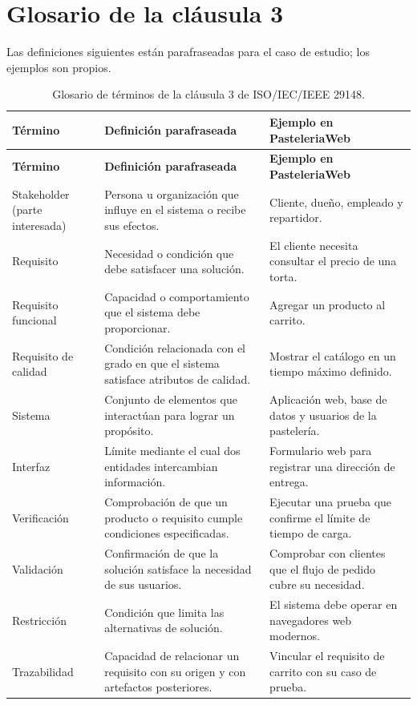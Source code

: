 \documentclass[11pt,a4paper]{article}
\begin{document}
\section{Glosario de la cláusula 3}
Las definiciones siguientes están parafraseadas para el caso de estudio; los ejemplos son propios.

\begin{longtable}{@{}L{0.24\textwidth} L{0.36\textwidth} L{0.30\textwidth}@{}}
\caption{Glosario de términos de la cláusula 3 de ISO/IEC/IEEE 29148.}\label{tab:glosario}\\
\toprule
\textbf{Término} & \textbf{Definición parafraseada} & \textbf{Ejemplo en PasteleriaWeb} \\
\midrule
\endfirsthead
\toprule
\textbf{Término} & \textbf{Definición parafraseada} & \textbf{Ejemplo en PasteleriaWeb} \\
\midrule
\endhead
Stakeholder (parte interesada) & Persona u organización que influye en el sistema o recibe sus efectos. & Cliente, dueño, empleado y repartidor. \\
Requisito & Necesidad o condición que debe satisfacer una solución. & El cliente necesita consultar el precio de una torta. \\
Requisito funcional & Capacidad o comportamiento que el sistema debe proporcionar. & Agregar un producto al carrito. \\
Requisito de calidad & Condición relacionada con el grado en que el sistema satisface atributos de calidad. & Mostrar el catálogo en un tiempo máximo definido. \\
Sistema & Conjunto de elementos que interactúan para lograr un propósito. & Aplicación web, base de datos y usuarios de la pastelería. \\
Interfaz & Límite mediante el cual dos entidades intercambian información. & Formulario web para registrar una dirección de entrega. \\
Verificación & Comprobación de que un producto o requisito cumple condiciones especificadas. & Ejecutar una prueba que confirme el límite de tiempo de carga. \\
Validación & Confirmación de que la solución satisface la necesidad de sus usuarios. & Comprobar con clientes que el flujo de pedido cubre su necesidad. \\
Restricción & Condición que limita las alternativas de solución. & El sistema debe operar en navegadores web modernos. \\
Trazabilidad & Capacidad de relacionar un requisito con su origen y con artefactos posteriores. & Vincular el requisito de carrito con su caso de prueba. \\
\bottomrule
\end{longtable}
\end{document}
